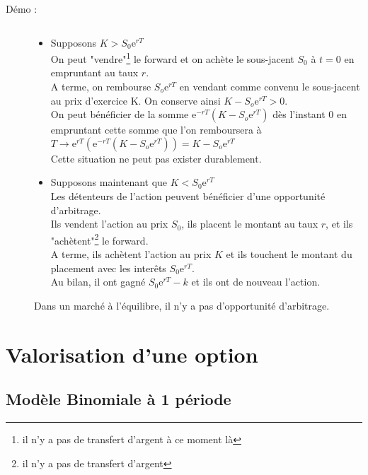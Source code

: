 \documentclass{report}
\begin{document}
\begin{description}
    \item [Démo : ] $\ $
    \begin{itemize}
        \item Supposons $K>S_0\mbox{e}^{rT}$\\
        On peut "vendre"\footnote{il n'y a pas de transfert d'argent à ce moment là} le forward et on achète le sous-jacent $S_0$ à $t=0$ en empruntant au taux $r$.\\
        A terme, on rembourse $S_o\mbox{e}^{rT}$ en vendant comme convenu le sous-jacent au prix d'exercice K. On conserve ainsi $K-S_o\mbox{e}^{rT}>0$.\\
        On peut bénéficier de la somme $\mbox{e}^{-rT}(K-S_o\mbox{e}^{rT})$ dès l'instant $0$ en empruntant cette somme que l'on remboursera à $T \to \mbox{e}^{rT}(\mbox{e}^{-rT}(K-S_o\mbox{e}^{rT})) = K-S_o\mbox{e}^{rT}$\\
        Cette situation ne peut pas exister durablement.
        \item Supposons maintenant que $K<S_0\mbox{e}^{rT}$\\
        Les détenteurs de l'action peuvent bénéficier d'une opportunité d'arbitrage.\\
        Ils vendent l'action au prix $S_0$, ils placent le montant au taux $r$, et ils "achètent"\footnote{il n'y a pas de transfert d'argent} le forward.\\
        A terme, ils achètent l'action au prix $K$ et ils touchent le montant du placement avec les interêts $S_0\mbox{e}^{rT}$.\\
        Au bilan, il ont gagné $S_0\mbox{e}^{rT}-k$ et ils ont de nouveau l'action.
    \end{itemize}
    Dans un marché à l'équilibre, il n'y a pas d'opportunité d'arbitrage. 
\end{description}
 







\section{Valorisation d'une option}
\subsection{Modèle Binomiale à 1 période}
\end{document}
